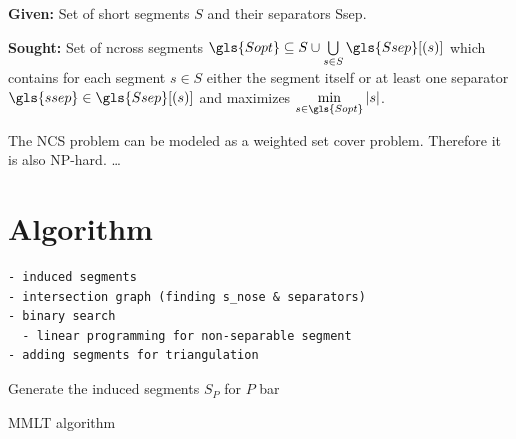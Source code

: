 \begin{problem}
  \hfill
	\begin{labeling}{\hspace{4em}}
		\item[\textbf{Given:}]
			Set of short segments \(S\) and their separators \gls{Ssep}.
		\item[\textbf{Sought:}]
			Set of \gls{ncross} segments \(\gls{Sopt} \subseteq S \cup
			\bigcup\limits_{s \in S} \gls{Ssep}[(s)] \) which contains
			for each segment \(s \in S\) either the segment itself or at
			least one separator \(\gls{ssep} \in \gls{Ssep}[(s)]\) and
			maximizes \(\min\limits_{s \in \gls{Sopt}} |s|\).
	\end{labeling}
\end{problem}

The \gls{NCS} problem can be modeled as a weighted set cover problem. 
Therefore it is also NP-hard. 
\ldots

\section{Algorithm}

\begin{verbatim}
- induced segments
- intersection graph (finding s_nose & separators)
- binary search
  - linear programming for non-separable segment
- adding segments for triangulation
\end{verbatim}

\begin{algorithm}
\DontPrintSemicolon
{}
Generate the induced segments \(S_P\) for \(P\) \;
bar \;
\caption{\gls{MMLT} algorithm}
\end{algorithm}
